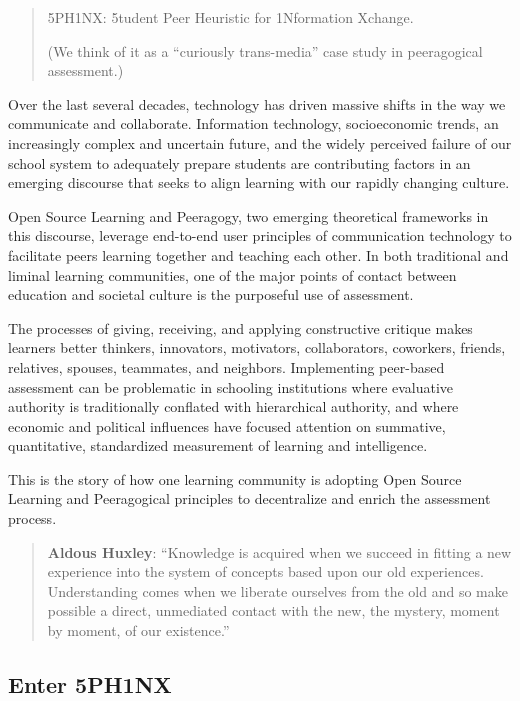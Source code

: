 \begin{quote}
5PH1NX: 5tudent Peer Heuristic for 1Nformation Xchange.

(We think of it as a ``curiously trans-media'' case study in
peeragogical assessment.)
\end{quote}

Over the last several decades, technology has driven massive shifts in
the way we communicate and collaborate. Information technology,
socioeconomic trends, an increasingly complex and uncertain future, and
the widely perceived failure of our school system to adequately prepare
students are contributing factors in an emerging discourse that seeks to
align learning with our rapidly changing culture.

Open Source Learning and Peeragogy, two emerging theoretical frameworks
in this discourse, leverage end-to-end user principles of communication
technology to facilitate peers learning together and teaching each
other. In both traditional and liminal learning communities, one of the
major points of contact between education and societal culture is the
purposeful use of assessment.

The processes of giving, receiving, and applying constructive critique
makes learners better thinkers, innovators, motivators, collaborators,
coworkers, friends, relatives, spouses, teammates, and
neighbors. Implementing peer-based assessment can be problematic in
schooling institutions where evaluative authority is traditionally
conflated with hierarchical authority, and where economic and
political influences have focused attention on summative,
quantitative, standardized measurement of learning and intelligence.

This is the story of how one learning community is adopting Open Source
Learning and Peeragogical principles to decentralize and enrich the
assessment process.

\begin{quote}
\textbf{Aldous Huxley}: ``Knowledge is acquired when we succeed in
fitting a new experience into the system of concepts based upon our old
experiences. Understanding comes when we liberate ourselves from the old
and so make possible a direct, unmediated contact with the new, the
mystery, moment by moment, of our existence.''
\end{quote}

\subsection{Enter 5PH1NX}\label{enter-5ph1nx}

